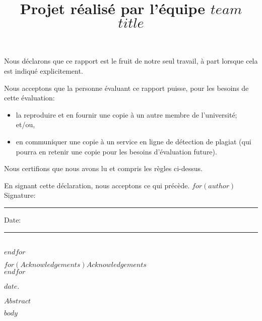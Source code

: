 \documentclass[mstat,12pt]{unswthesis}
\title{Projet réalisé par l'équipe $team$\\[0.5cm]$title$}
\author{\Authornameonly}
\begin{document}
\beforepreface




\vskip 2pc \noindent Nous déclarons que ce rapport est le fruit de notre seul travail, à part lorsque cela est indiqué  explicitement. 

\vskip 2pc  \noindent Nous acceptons que la personne évaluant ce rapport puisse, pour les besoins de cette évaluation:
\begin{itemize}
\item la reproduire et en fournir une copie à un autre membre de l'université; et/ou,
\item en communiquer une copie à un service en ligne de détection de plagiat (qui pourra en retenir une copie pour les besoins d'évaluation future).
\end{itemize}

\vskip 2pc \noindent Nous certifions que nous avons lu et compris les règles ci-dessus.\vspace{24pt}

\vskip 2pc \noindent En signant cette déclaration, nous acceptons ce qui précède.
\vskip 2pc \noindent
$for(author)$
Signature: \rule{7cm}{0.25pt} \hfill Date: \rule{4cm}{0.25pt} \\[1cm]
$endfor$
\vskip 1pc





{\bigskip}$for(Acknowledgements)$$Acknowledgements$\\[1cm] $endfor$

{\bigskip\bigskip\bigskip\noindent} $date$.




$Abstract$



\afterpreface





%
%






$body$
\end{document}
